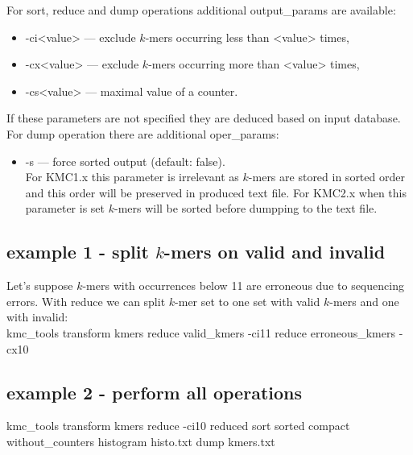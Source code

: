 For \textsf{sort}, \textsf{reduce} and \textsf{dump} operations additional \textsf{output\_params} are available:
\begin{itemize}
	\item \textsf{-ci<value>} --- exclude $k$-mers occurring less than <value> times,
	\item \textsf{-cx<value>} --- exclude $k$-mers occurring more than <value> times,
	\item \textsf{-cs<value>} --- maximal value of a counter.
\end{itemize}

If these parameters are not specified they are deduced based on input database. \\

For dump operation there are additional \textsf{oper\_params}:
\begin{itemize}
	\item \textsf{-s} --- force sorted output (default: false). \\
	For \textsf{KMC1.x} this parameter is irrelevant as $k$-mers are stored in sorted order and this order will be preserved in produced text file. For \textsf{KMC2.x} when this parameter is set $k$-mers will be sorted before dumpping to the text file.
\end{itemize}


\subsection *{example 1 - split $k$-mers on valid and invalid}
Let's suppose $k$-mers with occurrences below 11 are erroneous due to sequencing errors. With \textsf{reduce} we can split $k$-mer set to one set with valid $k$-mers and one with invalid: \\
kmc\_tools transform kmers reduce valid\_kmers -ci11 reduce erroneous\_kmers -cx10

\subsection*{example 2 - perform all operations}
kmc\_tools transform kmers reduce -ci10 reduced sort sorted compact without\_counters histogram histo.txt dump kmers.txt
